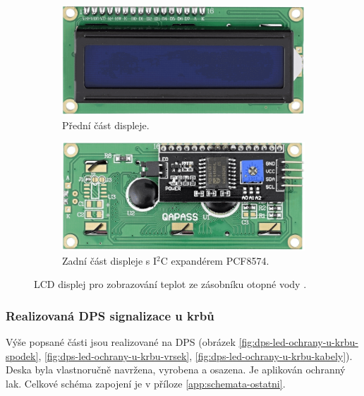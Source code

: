 \begin{figure}[H]
\centering
\begin{subfigure}{.5\textwidth}
  \centering
  \includegraphics[width=0.91\linewidth]{images/krb/predni-cast-lcd-displeje.png}
  \caption{Přední část displeje.}
  \label{fig:predni-cast-lcd-displeje}
\end{subfigure}%
\begin{subfigure}{.5\textwidth}
  \centering
  \includegraphics[width=0.9\linewidth]{images/krb/zadni-cast-lcd-displeje-s-expanderem-pcf8574.png}
  \caption{Zadní část displeje s I$^2$C expandérem PCF8574.}
  \label{fig:zadni-cast-lcd-displeje-s-expanderem-pcf857}
\end{subfigure}
\caption[LCD displej pro zobrazování teplot ze zásobníku otopné vody.]{LCD displej pro zobrazování teplot ze zásobníku otopné vody \cite{lcd-displej}.}
\label{fig:lcd-displej}
\end{figure}

\subsubsection{Realizovaná DPS signalizace u krbů}
Výše popsané části jsou realizované na DPS (obrázek \ref{fig:dps-led-ochrany-u-krbu-spodek}, \ref{fig:dps-led-ochrany-u-krbu-vrsek}, \ref{fig:dps-led-ochrany-u-krbu-kabely}). Deska byla vlastnoručně navržena, vyrobena a osazena. Je aplikován ochranný lak. Celkové schéma zapojení je v příloze \ref{app:schemata-ostatni}.

